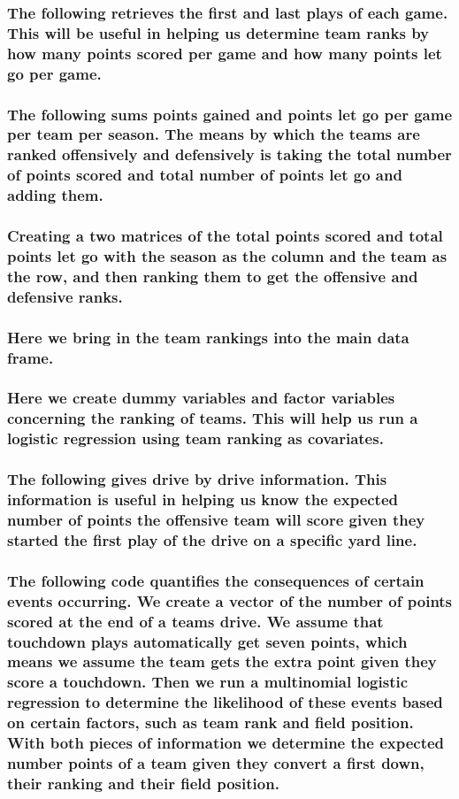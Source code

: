 \documentclass[letterpaper,10pt,english]{/anaconda/lib/python2.7/site-packages/sphinx/texinputs/sphinxhowto}
\begin{document}
\subsubsection{The following retrieves the first and last plays of each game. This will
be useful in helping us determine team ranks by how many points scored
per game and how many points let go per game.}

\subsubsection{The following sums points gained and points let go per game per team per
season. The means by which the teams are ranked offensively and
defensively is taking the total number of points scored and total number
of points let go and adding them.}

\subsubsection{Creating a two matrices of the total points scored and total points let
go with the season as the column and the team as the row, and then
ranking them to get the offensive and defensive ranks.}

\subsubsection{Here we bring in the team rankings into the main data frame.}

\subsubsection{Here we create dummy variables and factor variables concerning the
ranking of teams. This will help us run a logistic regression using team
ranking as covariates.}





\subsubsection{The following gives drive by drive information. This information is
useful in helping us know the expected number of points the offensive
team will score given they started the first play of the drive on a
specific yard line.}

\subsubsection{The following code quantifies the consequences of certain events
occurring. We create a vector of the number of points scored at the end
of a teams drive. We assume that touchdown plays automatically get seven
points, which means we assume the team gets the extra point given they
score a touchdown. Then we run a multinomial logistic regression to
determine the likelihood of these events based on certain factors, such
as team rank and field position. With both pieces of information we
determine the expected number points of a team given they convert a
first down, their ranking and their field position.}
\end{document}
